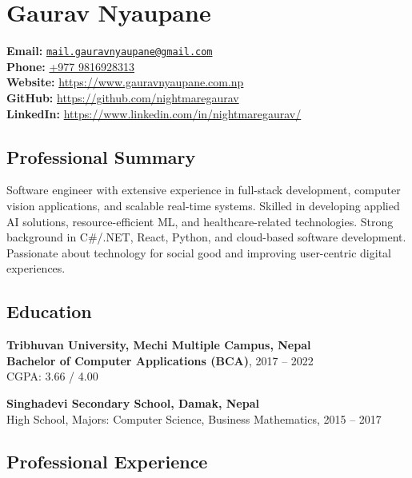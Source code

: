 \hypertarget{gaurav-nyaupane}{%
\section{\texorpdfstring{\textbf{Gaurav
Nyaupane}}{Gaurav Nyaupane}}\label{gaurav-nyaupane}}

\textbf{Email:}
\href{mailto:mail.gauravnyaupane@gmail.com}{\nolinkurl{mail.gauravnyaupane@gmail.com}}\\
\textbf{Phone:} \href{tel:+9779816928313}{+977 9816928313}\\
\textbf{Website:} \url{https://www.gauravnyaupane.com.np}\\
\textbf{GitHub:} \url{https://github.com/nightmaregaurav}\\
\textbf{LinkedIn:} \url{https://www.linkedin.com/in/nightmaregaurav/}

\hypertarget{professional-summary}{%
\subsection{\texorpdfstring{\textbf{Professional
Summary}}{Professional Summary}}\label{professional-summary}}

Software engineer with extensive experience in full-stack development,
computer vision applications, and scalable real-time systems. Skilled in
developing applied AI solutions, resource-efficient ML, and
healthcare-related technologies. Strong background in C\#/.NET, React,
Python, and cloud-based software development. Passionate about
technology for social good and improving user-centric digital
experiences.

\hypertarget{education}{%
\subsection{\texorpdfstring{\textbf{Education}}{Education}}\label{education}}

\textbf{Tribhuvan University, Mechi Multiple Campus, Nepal}\\
\textbf{Bachelor of Computer Applications (BCA)}, 2017 -- 2022\\
CGPA: 3.66 / 4.00

\textbf{Singhadevi Secondary School, Damak, Nepal}\\
High School, Majors: Computer Science, Business Mathematics, 2015 --
2017

\hypertarget{professional-experience}{%
\subsection{\texorpdfstring{\textbf{Professional
Experience}}{Professional Experience}}\label{professional-experience}}

